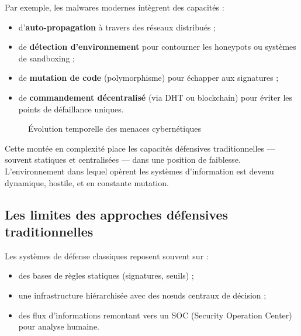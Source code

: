 \documentclass[ twoside,openright,titlepage,numbers=noenddot,headinclude,%
                footinclude=true,cleardoublepage=empty,abstractoff, %
                BCOR=5mm,paper=a4,fontsize=11pt,%
                french,american,%
                ]{scrreprt}
\begin{document}
Par exemple, les malwares modernes intègrent des capacités :
\begin{itemize}
    \item d’\textbf{auto-propagation} à travers des réseaux distribués ;
    \item de \textbf{détection d’environnement} pour contourner les honeypots ou systèmes de sandboxing ;
    \item de \textbf{mutation de code} (polymorphisme) pour échapper aux signatures ;
    \item de \textbf{commandement décentralisé} (via DHT ou blockchain) pour éviter les points de défaillance uniques.
\end{itemize}

\begin{figure}[H]
    \centering
    \caption{Évolution temporelle des menaces cybernétiques}
    \label{fig:evolution-menaces}
\end{figure}

Cette montée en complexité place les capacités défensives traditionnelles — souvent statiques et centralisées — dans une position de faiblesse. L’environnement dans lequel opèrent les systèmes d'information est devenu dynamique, hostile, et en constante mutation.

\vspace{0.5em}
\subsection*{Les limites des approches défensives traditionnelles}

Les systèmes de défense classiques reposent souvent sur :
\begin{itemize}
    \item des bases de règles statiques (signatures, seuils) ;
    \item une infrastructure hiérarchisée avec des nœuds centraux de décision ;
    \item des flux d’informations remontant vers un SOC (Security Operation Center) pour analyse humaine.
\end{itemize}
\end{document}
